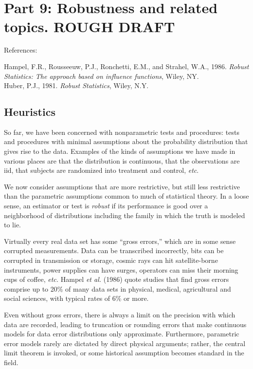 


\section{Part 9: Robustness and related topics. ROUGH DRAFT}
References:

\noindent
Hampel, F.R., Rousseeuw, P.J., Ronchetti, E.M., and Strahel, W.A., 1986.
{\em Robust Statistics: The approach based on influence functions}, Wiley, NY.
\\[.1in]
Huber, P.J., 1981. {\em Robust Statistics}, Wiley, N.Y.

\subsection{Heuristics}
So far, we have been concerned with nonparametric tests and procedures:
tests and procedures with minimal assumptions about the probability distribution
that gives rise to the data.
Examples of the kinds of assumptions we have made in various places are that the
distribution is continuous, that
the observations are iid, that subjects are randomized into treatment and control,
{\em etc\/}.

We now consider assumptions that are more restrictive, but still less
restrictive than the parametric assumptions common to much of statistical theory.
In a loose sense, an estimator or test is {\em robust\/} if its performance is
good over a neighborhood of distributions including the family in which the
truth is modeled to lie.

Virtually every real data set has some ``gross errors,'' which are
in some sense corrupted measurements.
Data can be transcribed incorrectly,
bits can be corrupted in transmission or storage, cosmic rays can hit satellite-borne
instruments, power supplies can have surges, operators can miss their
morning cups of coffee, {\em etc.}
Hampel {\em et al.\/} (1986) quote studies that find gross errors comprise up to 20\%
of many data sets in physical, medical, agricultural and social sciences, with typical
rates of 6\% or more.

Even  without gross errors, there is
always a limit on the precision with which data are recorded, leading to
truncation or rounding errors that make continuous models for data error
distributions only approximate.
Furthermore, parametric error models rarely are dictated by direct physical arguments;
rather,  the central limit theorem is invoked, or some historical assumption
becomes standard in the field.

